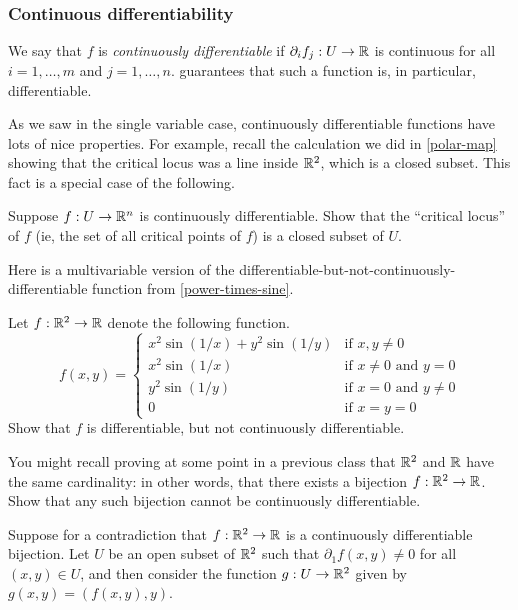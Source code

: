 \subsubsection*{Continuous differentiability}

\begin{definition}  \label{continuously-differentiable-definition}
	We say that $f$ is \emph{continuously differentiable} if $\partial_i f_j : U \to \mathbb{R}$ is continuous for all $i = 1, \dotsc, m$ and $j = 1, \dotsc, n$.  guarantees that such a function is, in particular, differentiable. 
\end{definition}

As we saw in the single variable case, continuously differentiable functions have lots of nice properties. For example, recall the calculation we did in \cref{polar-map} showing that the critical locus was a line inside $\mathbb{R}^2$, which is a closed subset. This fact is a special case of the following.

\begin{exercise} \label{critical-locus-closed}
	Suppose $f : U \to \mathbb{R}^n$ is continuously differentiable. Show that the ``critical locus'' of $f$ (ie, the set of all critical points of $f$) is a closed subset of $U$.
\end{exercise}

Here is a multivariable version of the differentiable-but-not-continuously-differentiable function from \cref{power-times-sine}. 

\begin{exercise}
	Let $f : \mathbb{R}^2 \to \mathbb{R}$ denote the following function.
	\[ f(x, y) = \begin{cases} x^2\sin(1/x) + y^2\sin(1/y) & \text{if } x, y \neq 0 \\
	x^2\sin(1/x) & \text{if } x \neq 0 \text{ and } y = 0 \\
	y^2\sin(1/y) & \text{if } x = 0 \text{ and } y \neq 0 \\
	0 & \text{if } x = y = 0 \end{cases} \]
	Show that $f$ is differentiable, but not continuously differentiable. 
\end{exercise}

\begin{exercise} \label{no-continously-differentiable-bijection}
	You might recall proving at some point in a previous class that $\mathbb{R}^2$ and $\mathbb{R}$ have the same cardinality: in other words, that there exists a bijection $f : \mathbb{R}^2 \to \mathbb{R}$. Show that any such bijection cannot be continuously differentiable. 
	
	\begin{hint}
		Suppose for a contradiction that $f : \mathbb{R}^2 \to \mathbb{R}$ is a continuously differentiable bijection.  Let $U$ be an open subset of $\mathbb{R}^2$ such that $\partial_1 f(x, y) \neq 0$ for all $(x,y) \in U$, and then consider the function $g : U \to \mathbb{R}^2$ given by $g(x, y) = (f(x, y), y)$. 
	\end{hint}
\end{exercise}

